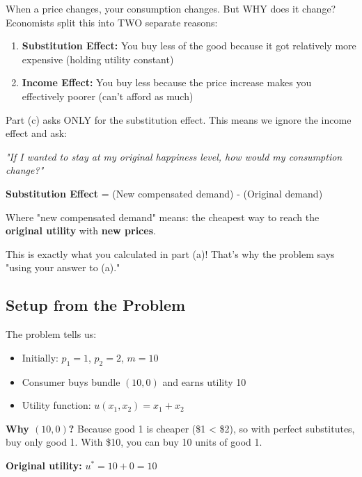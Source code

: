\documentclass[11pt]{article}
\begin{document}
When a price changes, your consumption changes. But WHY does it change? Economists split this into TWO separate reasons:

\begin{enumerate}
\item \textbf{Substitution Effect:} You buy less of the good because it got relatively more expensive (holding utility constant)
\item \textbf{Income Effect:} You buy less because the price increase makes you effectively poorer (can't afford as much)
\end{enumerate}

Part (c) asks ONLY for the substitution effect. This means we ignore the income effect and ask:

\begin{center}
\textit{"If I wanted to stay at my original happiness level, how would my consumption change?"}
\end{center}

\begin{tcolorbox}[colback=purple!5!white,colframe=purple!75!black,title=Key Formula]
\textbf{Substitution Effect} = (New compensated demand) - (Original demand)

Where "new compensated demand" means: the cheapest way to reach the \textbf{original utility} with \textbf{new prices}.
\end{tcolorbox}

This is exactly what you calculated in part (a)! That's why the problem says "using your answer to (a)."

\subsection{Setup from the Problem}

The problem tells us:

\begin{itemize}
\item Initially: $p_1 = 1$, $p_2 = 2$, $m = 10$
\item Consumer buys bundle $(10, 0)$ and earns utility 10
\item Utility function: $u(x_1, x_2) = x_1 + x_2$
\end{itemize}

\textbf{Why $(10, 0)$?} Because good 1 is cheaper (\$1 < \$2), so with perfect substitutes, buy only good 1. With \$10, you can buy 10 units of good 1.

\textbf{Original utility:} $u^* = 10 + 0 = 10$
\end{document}
